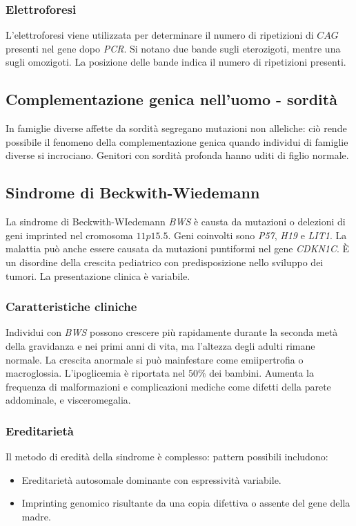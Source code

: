 		\subsubsection{Elettroforesi}
		L'elettroforesi viene utilizzata per determinare il numero di ripetizioni di $CAG$ presenti nel gene dopo \emph{PCR}. 
		Si notano due bande sugli eterozigoti, mentre una sugli omozigoti.
		La posizione delle bande indica il numero di ripetizioni presenti. 

	\subsection{Complementazione genica nell'uomo - sordit\`a}
	In famiglie diverse affette da sordit\`a segregano mutazioni non alleliche: ci\`o rende possibile il fenomeno della complementazione genica quando individui di famiglie diverse si incrociano.
	Genitori con sordit\`a profonda hanno uditi di figlio normale.

	\subsection{Sindrome di Beckwith-Wiedemann}
	La sindrome di Beckwith-WIedemann \emph{BWS} \`e causta da mutazioni o delezioni di geni imprinted nel cromosoma $11p15.5$. 
	Geni coinvolti sono \emph{P57}, \emph{H19} e \emph{LIT1}.
	La malattia pu\`o anche essere causata da mutazioni puntiformi nel gene \emph{CDKN1C}.
	\`E un disordine della crescita pediatrico con predisposizione nello sviluppo dei tumori. 
	La presentazione clinica \`e variabile.

		\subsubsection{Caratteristiche cliniche}
		Individui con \emph{BWS} possono crescere pi\`u rapidamente durante la seconda met\`a della gravidanza e nei primi anni di vita, ma l'altezza degli adulti rimane normale.
		La crescita anormale si pu\`o mainfestare come emiipertrofia o macroglossia.
		L'ipoglicemia \`e riportata nel $50\%$ dei bambini. 
		Aumenta la frequenza di malformazioni e complicazioni mediche come difetti della parete addominale, e visceromegalia.

		\subsubsection{Ereditariet\`a}
		Il metodo di eredit\`a della sindrome \`e complesso: pattern possibili includono:
		\begin{itemize}
			\item Ereditariet\`a autosomale dominante con espressivit\`a variabile.
			\item Imprinting genomico risultante da una copia difettiva o assente del gene della madre.
		\end{itemize}


